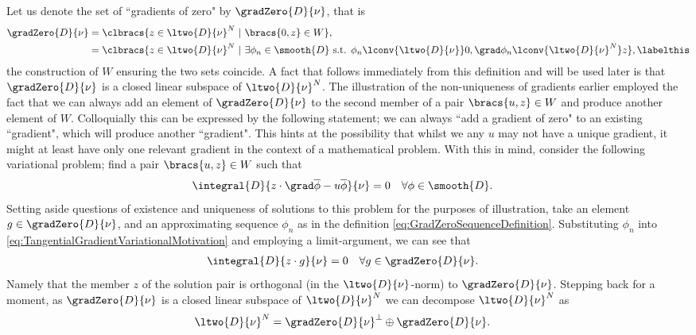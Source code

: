 Let us denote the set of ``gradients of zero" by $\gradZero{D}{\nu}$, that is
\begin{align*}
	\gradZero{D}{\nu} &= \clbracs{z\in\ltwo{D}{\nu}^N \ \vert \ \bracs{0,z}\in W}, \\
	&= \clbracs{z\in\ltwo{D}{\nu}^N \ \vert \ \exists\phi_n\in\smooth{D} \text{ s.t. } \phi_n\lconv{\ltwo{D}{\nu}}0, \grad\phi_n\lconv{\ltwo{D}{\nu}^N}z}, \labelthis\label{eq:GradZeroSequenceDefinition}
\end{align*}
the construction of $W$ ensuring the two sets coincide.
A fact that follows immediately from this definition and will be used later is that $\gradZero{D}{\nu}$ is a closed linear subspace of $\ltwo{D}{\nu}^N$.
The illustration of the non-uniqueness of gradients earlier employed the fact that we can always add an element of $\gradZero{D}{\nu}$ to the second member of a pair $\bracs{u,z}\in W$ and produce another element of $W$.
Colloquially this can be expressed by the following statement; we can always ``add a gradient of zero" to an existing ``gradient", which will produce another ``gradient".
This hints at the possibility that whilst we any $u$ may not have a unique gradient, it might at least have only one relevant gradient in the context of a mathematical problem.
With this in mind, consider the following variational problem; find a pair $\bracs{u,z}\in W$ such that
\begin{align} \label{eq:TangentialGradientVariationalMotivation}
	\integral{D}{z \cdot \grad\overline{\phi} - u\overline{\phi}}{\nu} &= 0 \quad \forall\phi\in\smooth{D}.
\end{align}
Setting aside questions of existence and uniqueness of solutions to this problem for the purposes of illustration, take an element $g\in\gradZero{D}{\nu}$, and an approximating sequence $\phi_n$ as in the definition \eqref{eq:GradZeroSequenceDefinition}.
Substituting $\phi_n$ into \eqref{eq:TangentialGradientVariationalMotivation} and employing a limit-argument, we can see that
\begin{align*}
	\integral{D}{z \cdot g}{\nu} &= 0 \quad \forall g\in\gradZero{D}{\nu}.
\end{align*}
Namely that the member $z$ of the solution pair is orthogonal (in the $\ltwo{D}{\nu}$-norm) to $\gradZero{D}{\nu}$.
Stepping back for a moment, as $\gradZero{D}{\nu}$ is a closed linear subspace of $\ltwo{D}{\nu}^N$ we can decompose $\ltwo{D}{\nu}^N$ as
\begin{align*}
	\ltwo{D}{\nu}^N &= \gradZero{D}{\nu}^{\perp} \oplus \gradZero{D}{\nu}.
\end{align*}
